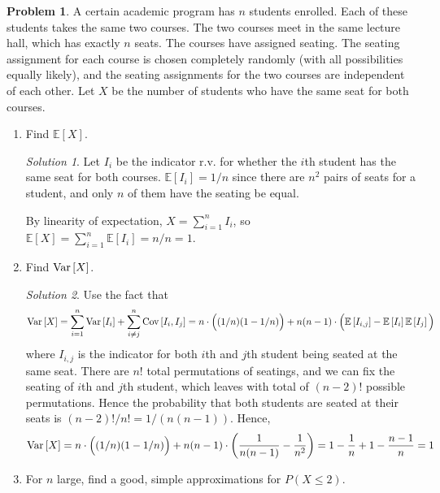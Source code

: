 \documentclass[11pt]{article}
\theoremstyle{definition}
\newtheorem{prob}[theo]{\color{Maroon} Problem}
\theoremstyle{remark}
\newtheorem*{soln}{\color{Maroon} Solution}
\newcommand{\E}[1]{\mathbb{E}\left[ #1 \right]}
\newcommand{\cov}[2]{\textnormal{Cov}\left[ #1, #2 \right]}
\renewcommand{\var}[1]{\textnormal{Var}\left[ #1 \right]}
\begin{document}
\pagebreak

\begin{prob} A certain academic program has $n$ students enrolled. Each of these students takes the same two courses. The two courses meet in the same lecture hall, which has exactly $n$ seats. The courses have assigned seating. The seating assignment for each course is chosen completely randomly (with all possibilities equally likely), and the seating assignments for the two courses are independent of each other. Let $X$ be the number of students who have the same seat for both courses.

\begin{enumerate}[label = (\alph*)]
    \item Find $\E{X}$.
    
    \begin{soln} Let $I_i$ be the indicator r.v. for whether the $i$th student has the same seat for both courses. $\E{I_i} = 1/n$ since there are $n^2$ pairs of seats for a student, and only $n$ of them have the seating be equal.
    
    By linearity of expectation, $X = \sum_{i=1}^n I_i$, so $\E{X} = \sum_{i=1}^n \E{I_i} = n/n = 1$.
    
    \end{soln}
    
    \dotfill
    
    \item Find $\var{X}$.
    
    \begin{soln} Use the fact that $$ \var{X} = \sum_{i=1}^n \var{I_i} + \sum_{i \neq j}^n \cov{I_i}{I_j} = n \cdot \Big((1/n)(1-1/n)\Big) + n(n-1) \cdot \Big( \E{I_{i,j}}-\E{I_i}\E{I_j} \Big) $$ where $I_{i,j}$ is the indicator for both $i$th and $j$th student being seated at the same seat. There are $n!$ total permutations of seatings, and we can fix the seating of $i$th and $j$th student, which leaves with total of $(n-2)!$ possible permutations. Hence the probability that both students are seated at their seats is $(n-2)!/n! = 1/(n(n-1))$. Hence, $$\var{X} = n \cdot \Big((1/n)(1-1/n)\Big) + n(n-1) \cdot \left( \frac{1}{n(n-1)} - \frac{1}{n^2} \right) = 1 - \frac{1}{n} + 1 - \frac{n-1}{n} = 1 $$
    
    \end{soln}
    
    \dotfill
    
    \item For $n$ large, find a good, simple approximations for $P(X \leq 2)$. 
    

\end{enumerate}
\end{prob}
\end{document}
